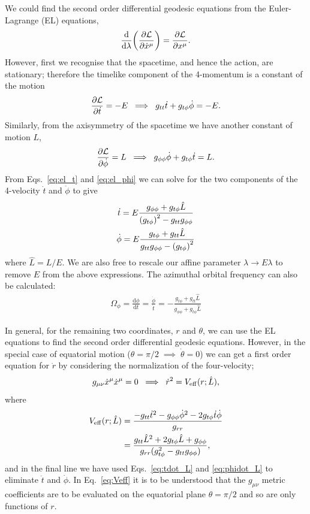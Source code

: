 We could find the second order differential geodesic equations from the Euler-Lagrange (EL) equations, 
\begin{gather} \label{eq:ELeqns_1}
	\dv{\lambda}(\pdv{\mathcal{L}}{\dot{x}^\mu}) = \pdv{\mathcal{L}}{x^\mu}.
\end{gather}
However, first we recognise that the spacetime, and hence the action, are stationary; therefore the timelike component of the 4-momentum is a constant of the motion
\begin{equation}\label{eq:el_t} 
	\pdv{\mathcal{L}}{\dot{t}} = -E \;\implies\; g_{tt}\dot{t} + g_{t\phi}\dot{\phi} = -E.
\end{equation}
Similarly, from the axisymmetry of the spacetime we have another constant of motion $L$,
\begin{equation}\label{eq:el_phi}
	\pdv{\mathcal{L}}{\dot{\phi}} =L \;\implies\; g_{\phi \phi}\dot{\phi} + g_{t\phi}\dot{t} = L.
\end{equation}
From Eqs.~\ref{eq:el_t} and \ref{eq:el_phi} we can solve for the two components of the 4-velocity $\dot{t}$ and $\dot{\phi}$ to give
\begin{gather} \label{eq:tdot_L}
	\dot{t} = E \frac{g_{\phi \phi} + g_{t \phi}\hat{L}}{\qty(g_{t \phi})^2 - g_{t t}g_{\phi \phi}} \\
	\label{eq:phidot_L}
	\dot{\phi} = E \frac{g_{t \phi} + g_{t t}\hat{L}}{g_{t t}g_{\phi \phi} - \qty(g_{t \phi})^2}
\end{gather}
where $\hat{L} = L/E$.
We are also free to rescale our affine parameter $\lambda\rightarrow E\lambda$ to remove $E$ from the above expressions.
The azimuthal orbital frequency can also be calculated:
\begin{gather}
	\Omega_\phi = \frac{\mathrm{d}\phi}{\mathrm{d}t} =  \frac{\dot{\phi}}{\dot{t}} = -\frac{g_{t\phi}+g_{tt}\hat{L}}{g_{\phi\phi}+g_{t\phi}\hat{L}}
\end{gather}

In general, for the remaining two coordinates, $r$ and $\theta$, we can use the EL equations to find the second order differential geodesic equations.
However, in the special case of equatorial motion ($\theta=\pi/2\;\implies\;\dot{\theta}=0$) we can get a first order equation for $\dot{r}$ by considering the normalization of the four-velocity;
\begin{equation} \label{eq:rdot}
	g_{\mu\nu}\dot{x}^\mu\dot{x}^\mu = 0 \;\implies\; \dot{r}^2 = V_{\rm eff}(r;\hat{L}),
\end{equation}
where
\begin{align}\label{eq:Veff}
	V_{\rm eff}(r;\hat{L}) &= \frac{-g_{tt}\dot{t}^2 -g_{\phi\phi}\dot{\phi}^2-2g_{t\phi}\dot{t}\dot{\phi} }{g_{rr}} \nonumber \\
	&= \frac{g_{tt} \hat{L}^2+2 g_{t\phi } \hat{L}+g_{\phi\phi}}{g_{rr}(g_{t\phi}^2-g_{tt} g_{\phi \phi})},
\end{align}
and in the final line we have used Eqs.~\ref{eq:tdot_L} and \ref{eq:phidot_L} to eliminate $\dot{t}$ and $\dot{\phi}$.
In Eq.~\ref{eq:Veff} it is to be understood that the $g_{\mu\nu}$ metric coefficients are to be evaluated on the equatorial plane $\theta=\pi/2$ and so are only functions of $r$.


